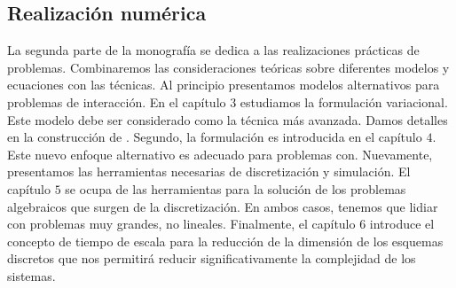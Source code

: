 \begin{partbacktext}
\part{Realización numérica}
La segunda parte de la monografía se dedica a las realizaciones prácticas de problemas. Combinaremos las consideraciones teóricas sobre diferentes modelos y ecuaciones con las técnicas. Al principio presentamos modelos alternativos para problemas de interacción. En el capítulo $3$ estudiamos la formulación variacional. Este modelo debe ser considerado como la técnica más avanzada. Damos detalles en la construcción de . Segundo, la formulación es introducida en el capítulo $4$. Este nuevo enfoque alternativo es adecuado para problemas con. Nuevamente, presentamos las herramientas necesarias de discretización y simulación. El capítulo $5$ se ocupa de las herramientas para la solución de los problemas algebraicos que surgen de la discretización. En ambos casos, tenemos que lidiar con problemas muy grandes, no lineales. Finalmente, el capítulo $6$ introduce el concepto de tiempo de escala para la reducción de la dimensión de los esquemas discretos que nos permitirá reducir significativamente la complejidad de los sistemas.
\end{partbacktext}